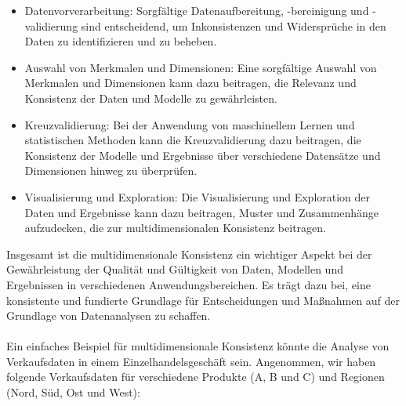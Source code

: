 \begin{itemize}
\item Datenvorverarbeitung: Sorgfältige Datenaufbereitung, -bereinigung und -validierung sind entscheidend, um Inkonsistenzen und Widersprüche in den Daten zu identifizieren und zu beheben.
\item Auswahl von Merkmalen und Dimensionen: Eine sorgfältige Auswahl von Merkmalen und Dimensionen kann dazu beitragen, die Relevanz und Konsistenz der Daten und Modelle zu gewährleisten.
\item Kreuzvalidierung: Bei der Anwendung von maschinellem Lernen und statistischen Methoden kann die Kreuzvalidierung dazu beitragen, die Konsistenz der Modelle und Ergebnisse über verschiedene Datensätze und Dimensionen hinweg zu überprüfen.
\item Visualisierung und Exploration: Die Visualisierung und Exploration der Daten und Ergebnisse kann dazu beitragen, Muster und Zusammenhänge aufzudecken, die zur multidimensionalen Konsistenz beitragen.
\end{itemize}
Insgesamt ist die multidimensionale Konsistenz ein wichtiger Aspekt bei der Gewährleistung der Qualität und Gültigkeit von Daten, Modellen und Ergebnissen in verschiedenen Anwendungsbereichen. Es trägt dazu bei, eine konsistente und fundierte Grundlage für Entscheidungen und Maßnahmen auf der Grundlage von Datenanalysen zu schaffen.
\\\\
Ein einfaches Beispiel für multidimensionale Konsistenz könnte die Analyse von Verkaufsdaten in einem Einzelhandelsgeschäft sein. Angenommen, wir haben folgende Verkaufsdaten für verschiedene Produkte (A, B und C) und Regionen (Nord, Süd, Ost und West):

